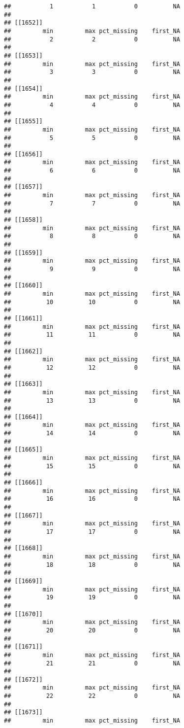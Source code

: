 \documentclass[
]{article}
\begin{document}
\begin{verbatim}
##           1           1           0          NA 
## 
## [[1652]]
##         min         max pct_missing    first_NA 
##           2           2           0          NA 
## 
## [[1653]]
##         min         max pct_missing    first_NA 
##           3           3           0          NA 
## 
## [[1654]]
##         min         max pct_missing    first_NA 
##           4           4           0          NA 
## 
## [[1655]]
##         min         max pct_missing    first_NA 
##           5           5           0          NA 
## 
## [[1656]]
##         min         max pct_missing    first_NA 
##           6           6           0          NA 
## 
## [[1657]]
##         min         max pct_missing    first_NA 
##           7           7           0          NA 
## 
## [[1658]]
##         min         max pct_missing    first_NA 
##           8           8           0          NA 
## 
## [[1659]]
##         min         max pct_missing    first_NA 
##           9           9           0          NA 
## 
## [[1660]]
##         min         max pct_missing    first_NA 
##          10          10           0          NA 
## 
## [[1661]]
##         min         max pct_missing    first_NA 
##          11          11           0          NA 
## 
## [[1662]]
##         min         max pct_missing    first_NA 
##          12          12           0          NA 
## 
## [[1663]]
##         min         max pct_missing    first_NA 
##          13          13           0          NA 
## 
## [[1664]]
##         min         max pct_missing    first_NA 
##          14          14           0          NA 
## 
## [[1665]]
##         min         max pct_missing    first_NA 
##          15          15           0          NA 
## 
## [[1666]]
##         min         max pct_missing    first_NA 
##          16          16           0          NA 
## 
## [[1667]]
##         min         max pct_missing    first_NA 
##          17          17           0          NA 
## 
## [[1668]]
##         min         max pct_missing    first_NA 
##          18          18           0          NA 
## 
## [[1669]]
##         min         max pct_missing    first_NA 
##          19          19           0          NA 
## 
## [[1670]]
##         min         max pct_missing    first_NA 
##          20          20           0          NA 
## 
## [[1671]]
##         min         max pct_missing    first_NA 
##          21          21           0          NA 
## 
## [[1672]]
##         min         max pct_missing    first_NA 
##          22          22           0          NA 
## 
## [[1673]]
##         min         max pct_missing    first_NA 

\end{verbatim}
\end{document}
